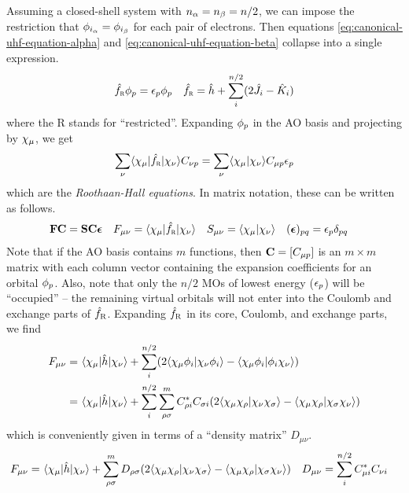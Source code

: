 \documentclass[11pt]{article}
\numberwithin{equation}{section}
\begin{document}
Assuming a closed-shell system with $n_{\alpha }=n_{\beta }=n/2$, we can impose the restriction that $\phi _{i_{\alpha }}=\phi _{i_{\beta }}$ for each pair of electrons.
Then equations \ref{eq:canonical-uhf-equation-alpha} and \ref{eq:canonical-uhf-equation-beta} collapse into a single expression.
\begin{align*}
  \hat{f}_\textsc{r}\phi _p
=
  \epsilon _p\phi _p
&&
  \hat{f}_\textsc{r}
=
  \hat{h}
+
  \sum_i^{n/2}
  (2\hat{J}_i - \hat{K}_i)
\end{align*}
where the R stands for ``restricted''.
Expanding $\phi _p$ in the AO basis and projecting by $\x_\mu$, we get
\begin{align*}
  \sum_\nu
  \ip{\x_\mu|\op{f}_\textsc{r}|\x_\nu}
  C_{\nu p}
=
  \sum_\nu
  \ip{\x_\mu|\x_\nu}C_{\mu p}\ev_p
\end{align*}
which are the \textit{Roothaan-Hall equations}.
In matrix notation, these can be written as follows.
\begin{align}\label{eq:roothaan-hall}
&
  \bo{F}\bo{C}
=
  \bo{S}\bo{C}\bm{\ev}
&&
  F_{\mu\nu}
=
  \ip{\x_\mu|\op{f}_\textsc{r}|\x_\nu}
&&
  S_{\mu\nu}
=
  \ip{\x_\mu|\x_\nu}
&&
  (\bm{\ev})_{pq}
=
  \ev_p\d_{pq}
\end{align}
Note that if the AO basis contains $m$ functions, then $\bo{C}=[C_{\mu p}]$ is an $m\times m$ matrix with each column vector containing the expansion coefficients for an orbital $\phi _p$.
Also, note that only the $n/2$ MOs of lowest energy ($\epsilon _p$) will be ``occupied'' -- the remaining virtual orbitals will not enter into the Coulomb and exchange parts of $\hat{f}_\textsc{R}$.
Expanding $\hat{f}_\textsc{R}$ in its core, Coulomb, and exchange parts, we find
\begin{align*}
  F_{\mu\nu}
=&\
  \ip{\x_\mu|\op{h}|\x_\nu}
+
  \sum_i^{n/2}
  (2\ip{\x_\mu\f_i|\x_\nu\f_i}-\ip{\x_\mu\f_i|\f_i\x_\nu})
\\
=&\
  \ip{\x_\mu|\op{h}|\x_\nu}
+
  \sum_i^{n/2}
  \sum_{\rho\si}^m
  C_{\rho i}^*C_{\si i}
  (2\ip{\x_\mu\x_\rho|\x_\nu\x_\si}-\ip{\x_\mu\x_\rho|\x_\si\x_\nu})
\end{align*}
which is conveniently given in terms of a ``density matrix'' $D_{\mu\nu}$.
\begin{align}\label{eq:rhf-ao-basis-fock}
  F_{\mu\nu}
=&\
  \ip{\x_\mu|\op{h}|\x_\nu}
+
  \sum_{\rho\si}^m
  D_{\rho\si}
  (2\ip{\x_\mu\x_\rho|\x_\nu\x_\si}-\ip{\x_\mu\x_\rho|\x_\si\x_\nu})
&&
  D_{\mu\nu}
=
  \sum_i^{n/2}
  C_{\mu i}^*C_{\nu i}
\end{align}
\end{document}
